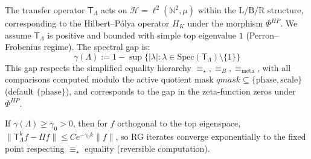 \begin{definition}
\label{def:transfer-operator-lbr}
The transfer operator $\mathsf{T}_\Lambda$ acts on $\mathcal{H}=\ell^2(\mathbb{N}^2,\mu)$ within the L/B/R structure, corresponding to the Hilbert–Pólya operator $H_K$ under the morphism $\Phi^{HP}$. We assume $\mathsf{T}_\Lambda$ is positive and bounded with simple top eigenvalue $1$ (Perron–Frobenius regime). The spectral gap is:
\[
\gamma(\Lambda):=1-\sup\{|\lambda|:\lambda\in\mathrm{Spec}(\mathsf{T}_\Lambda)\setminus\{1\}\}
\]
This gap respects the simplified equality hierarchy $\equiv_\star, \equiv_B, \equiv_{\text{meta}}$, with all comparisons computed modulo the active quotient mask $qmask \subseteq \{\text{phase}, \text{scale}\}$ (default $\{\text{phase}\}$), and corresponds to the gap in the zeta-function zeros under $\Phi^{HP}$.
\end{definition}

\begin{theorem}
\label{thm:mixing-convergence-lbr}
If $\gamma(\Lambda)\ge\gamma_0>0$, then for $f$ orthogonal to the top eigenspace, $\|\mathsf{T}_\Lambda^k f - \Pi f\|\le C e^{-\gamma_0 k}\|f\|$,
so RG iterates converge exponentially to the fixed point respecting $\equiv_\star$ equality (reversible computation).
\end{theorem}

